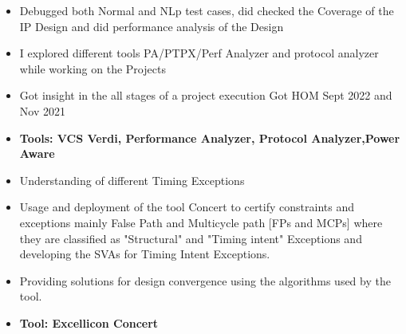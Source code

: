 \documentclass[10pt,a4paper,ragged2e]{altacv}
\begin{document}
\begin{itemize}
\item Debugged both Normal and NLp test cases, did checked the Coverage of the IP Design and did performance analysis of the Design
\item I explored different tools PA/PTPX/Perf Analyzer and protocol analyzer while working on the Projects
\item Got insight in the all stages of a project execution
\itme Got HOM Sept 2022 and Nov 2021
\item\bf{Tools}{: VCS Verdi, Performance Analyzer, Protocol Analyzer,Power Aware}
\end{itemize}

\divider

\begin{itemize}
\item Understanding of different Timing Exceptions
\item Usage and deployment of the tool Concert to certify constraints and exceptions mainly False Path and Multicycle path
[FPs and MCPs] where they are classified as "Structural" and "Timing intent" Exceptions and developing the SVAs for Timing Intent Exceptions.
\item Providing solutions for design convergence using the algorithms used by the tool.
\smallskip
\item\bf{Tool}{: Excellicon Concert}
\end{itemize}
\end{document}
